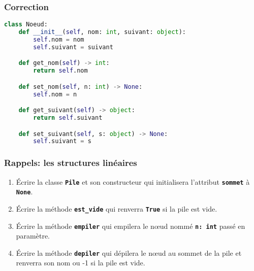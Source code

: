 \documentclass[svgnames,11pt]{beamer}
\begin{document}
\begin{frame}[fragile]
    \frametitle{Correction}

\begin{center}
\begin{lstlisting}[language=Python , basicstyle=\ttfamily\small, xleftmargin=0.2em, xrightmargin=0em]
class Noeud:
    def __init__(self, nom: int, suivant: object):
        self.nom = nom
        self.suivant = suivant

    def get_nom(self) -> int:
        return self.nom

    def set_nom(self, n: int) -> None:
        self.nom = n

    def get_suivant(self) -> object:
        return self.suivant

    def set_suivant(self, s: object) -> None:
        self.suivant = s
\end{lstlisting}
\end{center} 

\end{frame}
\begin{frame}
    \frametitle{Rappels: les structures linéaires}

    \begin{center}
    

    \end{center}

\end{frame}
\begin{frame}

    \begin{activite}
    \begin{enumerate}
        \item Écrire la classe \textbf{\texttt{Pile}} et son constructeur qui initialisera l'attribut \textbf{\texttt{sommet}} à \textbf{\texttt{None}}.
        \item Écrire la méthode \textbf{\texttt{est\_vide}} qui renverra \textbf{\texttt{True}} si la pile est vide.
        \item Écrire la méthode \textbf{\texttt{empiler}} qui empilera le nœud nommé \textbf{\texttt{n: int}} passé en paramètre.
        \item Écrire la méthode \textbf{\texttt{depiler}} qui dépilera le nœud au sommet de la pile et renverra son nom ou -1 si la pile est vide.
    \end{enumerate}
    \end{activite}

\end{frame}
\end{document}
